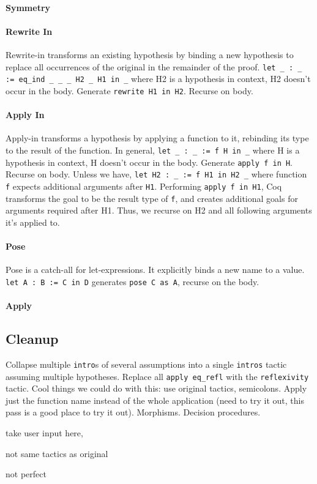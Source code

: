 \paragraph{Symmetry}

\paragraph{Rewrite In}
Rewrite-in transforms an existing hypothesis by binding a new hypothesis to replace all occurrences of the original in the remainder of the proof.
\lstinline{let _ : _ := eq_ind _ _ _ H2 _ H1 in _} where
		H2 is a hypothesis in context,
		H2 doesn’t occur in the body.
		Generate \lstinline{rewrite H1 in H2}. Recurse on body.

\paragraph{Apply In}
Apply-in transforms a hypothesis by applying a function to it, rebinding its type to the result of the function.
		In general,
		\lstinline{let _ : _ := f H in _} where
		H is a hypothesis in context,
		H doesn’t occur in the body.
		Generate  \lstinline{apply f in H}. Recurse on body.
		Unless we have,
		\lstinline{let H2 : _ := f H1 in H2 _} where
function \lstinline{f} expects additional arguments after \lstinline{H1}.
Performing \lstinline{apply f in H1}, Coq transforms the goal to be the result type of \lstinline{f}, and creates additional goals for arguments required after H1. Thus, we recurse on H2 and all following arguments it’s applied to.

\paragraph{Pose}
Pose is a catch-all for let-expressions. It explicitly binds a new name to a value.
\lstinline{let A : B := C in D} generates \lstinline{pose C as A}, recurse on the body.

\paragraph{Apply}

\subsection{Cleanup}
\label{sec:second}

Collapse multiple \lstinline{intro}s of several assumptions into a single \lstinline{intros} tactic assuming multiple hypotheses.
Replace all \lstinline{apply eq_refl} with the \lstinline{reflexivity} tactic.
Cool things we could do with this: use original tactics, semicolons. Apply just the function name instead of the whole application (need to try it out, this pass is a good place to try it out). Morphisms. Decision procedures.

take user input here,

not same tactics as original

not perfect




